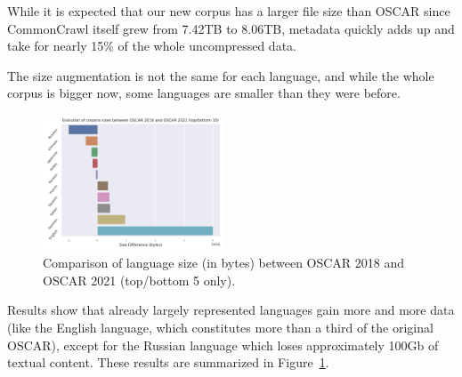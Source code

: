 While it is expected that our new corpus has a larger file size than OSCAR since CommonCrawl itself grew from 7.42TB to 8.06TB, metadata quickly adds up and take for nearly 15\% of the whole uncompressed data.

\begin{table}[t]
    \centering\small
    \caption{Comparison of CommonCrawl and OSCAR sizes between 2018 and 2021 versions. Compressed (CommonCrawl) sources are from November 2018 and February 2021. Total is Textual + Metadata without deduplication.}
    \label{tab:oscar-size}
\end{table}

The size augmentation is not the same for each language, and while the whole corpus is bigger now, some languages are smaller than they were before.

\begin{figure}[ht]
    \includegraphics[width=0.48\textwidth, angle=0]{static/media/oscar/ungoliant/size_evo}
    \caption{Comparison of language size (in bytes) between OSCAR 2018 and OSCAR 2021 (top/bottom 5 only). }
    \label{fig:lang-size}
\end{figure}

Results show that already largely represented languages gain more and more data (like the English language, which constitutes more than a third of the original OSCAR), except for the Russian language which loses approximately 100Gb of textual content. These results are summarized in Figure~\ref{fig:lang-size}.

